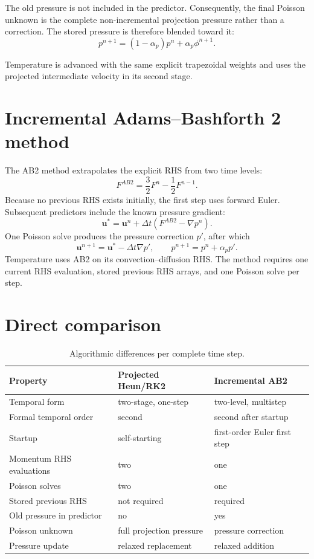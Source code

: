 \documentclass[11pt,a4paper]{article}
\begin{document}
The old pressure is not included in the predictor. Consequently, the final
Poisson unknown is the complete non-incremental projection pressure rather
than a correction. The stored pressure is therefore blended toward it:
\begin{equation}
 p^{n+1}=(1-\alpha_p)p^n+\alpha_p\phi^{n+1}.
\end{equation}

Temperature is advanced with the same explicit trapezoidal weights and uses
the projected intermediate velocity in its second stage.

\section{Incremental Adams--Bashforth 2 method}

The AB2 method extrapolates the explicit RHS from two time levels:
\begin{equation}
 F^{AB2}=\frac{3}{2}F^n-\frac{1}{2}F^{n-1}.
\end{equation}
Because no previous RHS exists initially, the first step uses forward Euler.
Subsequent predictors include the known pressure gradient:
\begin{equation}
 \bm{u}^{*}=\bm{u}^{n}+\Delta t
 \left(F^{AB2}-\nabla p^n\right).
\end{equation}
One Poisson solve produces the pressure correction $p'$, after which
\begin{equation}
 \bm{u}^{n+1}=\bm{u}^{*}-\Delta t\nabla p',
 \qquad p^{n+1}=p^n+\alpha_p p'.
\end{equation}
Temperature uses AB2 on its convection--diffusion RHS. The method requires
one current RHS evaluation, stored previous RHS arrays, and one Poisson solve
per step.

\section{Direct comparison}

\begin{table}[H]
\centering
\caption{Algorithmic differences per complete time step.}
\begin{tabular}{p{4.4cm}p{4.5cm}p{4.5cm}}
\toprule
Property & Projected Heun/RK2 & Incremental AB2 \\
\midrule
Temporal form & two-stage, one-step & two-level, multistep \\
Formal temporal order & second & second after startup \\
Startup & self-starting & first-order Euler first step \\
Momentum RHS evaluations & two & one \\
Poisson solves & two & one \\
Stored previous RHS & not required & required \\
Old pressure in predictor & no & yes \\
Poisson unknown & full projection pressure & pressure correction \\
Pressure update & relaxed replacement & relaxed addition \\
\bottomrule
\end{tabular}
\end{table}
\end{document}
